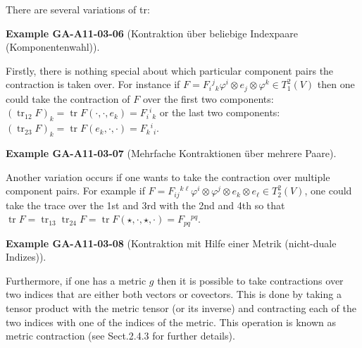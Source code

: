 \documentclass[10pt, letterpaper]{article}
\newcommand{\CustomHeading}[3]{%
  \par\medskip\noindent%
  \textbf{#1 #2} \textnormal{(#3)}.\enskip%
}
\newenvironment{EXA}[2]{\begin{unitbox}\CustomHeading{Example}{#1}{#2}}{\end{unitbox}}
\begin{document}
There are several variations of tr: 

\begin{EXA}{GA-A11-03-06}{Kontraktion über beliebige Indexpaare (Komponentenwahl)}
Firstly, there is nothing special about which particular component pairs the contraction is taken over. For instance if $F=F_{i}{ }^{j}{ }_{k} \varphi^{i} \otimes e_{j} \otimes \varphi^{k} \in T_{1}^{2}(V)$ then one could take the contraction of $F$ over the first two components: $\left(\operatorname{tr}_{12} F\right)_{k}=\operatorname{tr} F\left(\cdot, \cdot, e_{k}\right)=F_{i}{ }^{i}{ }_{k}$ or the last two components: $\left(\operatorname{tr}_{23} F\right)_{k}=\operatorname{tr} F\left(e_{k}, \cdot, \cdot\right)=F_{k}{ }^{i}{ }_{i}$.
\end{EXA}


\begin{EXA}{GA-A11-03-07}{Mehrfache Kontraktionen über mehrere Paare}
Another variation occurs if one wants to take the contraction over multiple component pairs. For example if $F=F_{i j}{ }^{k \ell} \varphi^{i} \otimes \varphi^{j} \otimes e_{k} \otimes e_{\ell} \in T_{2}^{2}(V)$, one could take the trace over the 1st and 3rd with the 2nd and 4th so that $\operatorname{tr} F=\operatorname{tr}_{13} \operatorname{tr}_{24} F=\operatorname{tr} F(\star, \cdot, \star, \cdot)=F_{p q}{ }^{p q}$.
\end{EXA}



\begin{EXA}{GA-A11-03-08}{Kontraktion mit Hilfe einer Metrik (nicht-duale Indizes)}
Furthermore, if one has a metric $g$ then it is possible to take contractions over two indices that are either both vectors or covectors. This is done by taking a tensor product with the metric tensor (or its inverse) and contracting each of the two indices with one of the indices of the metric. This operation is known as metric contraction (see Sect.2.4.3 for further details).
\end{EXA}
\end{document}
